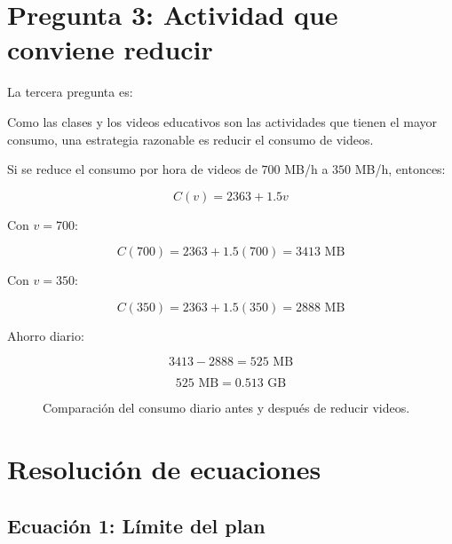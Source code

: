 \documentclass[12pt,a4paper]{article}
\begin{document}
	\section{Pregunta 3: Actividad que conviene reducir}
	
	La tercera pregunta es:
	
	\begin{quote}
	\end{quote}
	
	Como las clases y los videos educativos son las actividades que tienen el mayor consumo, una estrategia razonable es reducir el consumo de videos.
	
	Si se reduce el consumo por hora de videos de $700$ MB/h a $350$ MB/h, entonces:
	
	\[
	C(v)=2363+1.5v
	\]
	
	Con $v=700$:
	
	\[
	C(700)=2363+1.5(700)=3413\text{ MB}
	\]
	
	Con $v=350$:
	
	\[
	C(350)=2363+1.5(350)=2888\text{ MB}
	\]
	
	Ahorro diario:
	
	\[
	3413-2888=525\text{ MB}
	\]
	
	\[
	525\text{ MB}=0.513\text{ GB}
	\]
	
	\begin{figure}[H]
		\centering
		\caption{Comparación del consumo diario antes y después de reducir videos.}
	\end{figure}
	
	\section{Resolución de ecuaciones}
	
	\subsection{Ecuación 1: Límite del plan}
	
\end{document}
